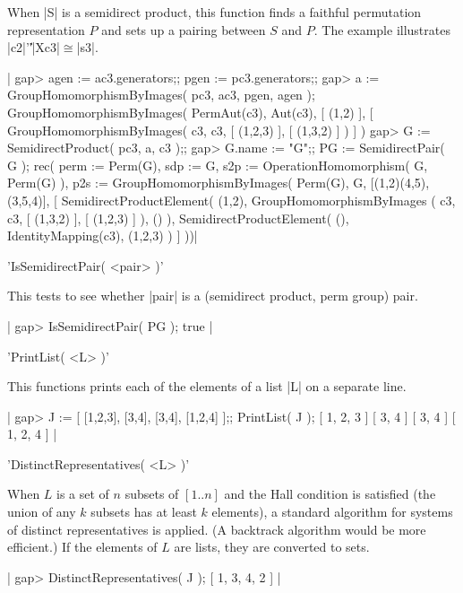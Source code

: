 When  |S|  is a semidirect  product,   this function finds  a faithful
permutation  representation $P$ and sets  up a pairing between $S$ and
$P$.  The example illustrates |c2|'\|'|Xc3|$\cong$|s3|.

|    gap> agen := ac3.generators;; pgen := pc3.generators;;
    gap> a := GroupHomomorphismByImages( pc3, ac3, pgen, agen );
    GroupHomomorphismByImages( PermAut(c3), Aut(c3), [ (1,2) ], 
    [ GroupHomomorphismByImages( c3, c3, [ (1,2,3) ], [ (1,3,2) ] ) ] )
    gap> G := SemidirectProduct( pc3, a, c3 );;
    gap> G.name := "G";;  PG := SemidirectPair( G );
    rec(
      perm := Perm(G),
      sdp := G,
      s2p := OperationHomomorphism( G, Perm(G) ),
      p2s := GroupHomomorphismByImages( Perm(G), G, [(1,2)(4,5), (3,5,4)],
        [ SemidirectProductElement( (1,2), GroupHomomorphismByImages
              ( c3, c3, [ (1,3,2) ], [ (1,2,3) ] ), () ), 
        SemidirectProductElement( (), IdentityMapping(c3), (1,2,3) ) ] ))|

%

'IsSemidirectPair( <pair> )'

This tests to see whether |pair| is a (semidirect product, perm group) pair.

|    gap> IsSemidirectPair( PG );
    true |

%

'PrintList( <L> )'

This functions prints each of the elements of a list |L| on a separate
line.

|    gap> J := [ [1,2,3], [3,4], [3,4], [1,2,4] ];; PrintList( J );
    [ 1, 2, 3 ]
    [ 3, 4 ]
    [ 3, 4 ]
    [ 1, 2, 4 ]  |

%

'DistinctRepresentatives( <L> )'

When $L$ is a set of $n$ subsets of $[1..n]$ and the Hall condition is
satisfied (the union of any $k$ subsets  has at least $k$ elements), a
standard algorithm for systems of distinct representatives is applied.
(A backtrack algorithm would  be more efficient.)   If the elements of
$L$ are lists, they are converted to sets.

|    gap> DistinctRepresentatives( J );
    [ 1, 3, 4, 2 ]  |

